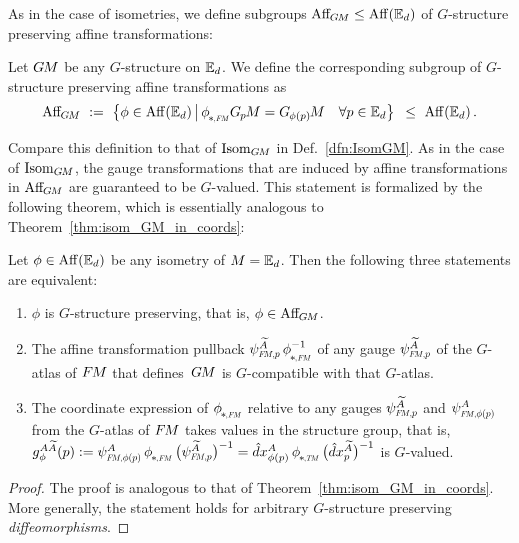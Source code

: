 As in the case of isometries, we define subgroups $\operatorname{Aff}_{\mkern-2muG\mkern-1.4muM} \leq \operatorname{Aff}(\mathbb{E}_d)$ of $G$-structure preserving affine transformations:
\begin{dfn}
\label{dfn:AffGM}
    Let $G\mkern-1.4muM$ be any $G$-structure on $\mathbb{E}_d$.
    We define the corresponding subgroup of $G$-structure preserving affine transformations as
    \begin{align}
        \AffGM\ :=\ \big\{ \phi \in \AffE 
        \,\big|\, \dphiFM \GpM = \GphipM\ \ \ \forall p \in \Euc_d \big\} 
        \,\ \leq\ \AffE \,.
    \end{align}
\end{dfn}
Compare this definition to that of $\operatorname{Isom}_{G\mkern-1.4muM}$ in Def.~\ref{dfn:IsomGM}.
As in the case of $\operatorname{Isom}_{G\mkern-1.4muM}$, the gauge transformations that are induced by affine transformations in $\operatorname{Aff}_{\mkern-2muG\mkern-1.4muM}$ are guaranteed to be $G$-valued.
This statement is formalized by the following theorem, which is essentially analogous to Theorem~\ref{thm:isom_GM_in_coords}:
\begin{thm}
\label{thm:Aff_GM_in_gauges}
    Let $\phi \in \operatorname{Aff}(\mathbb{E}_d)$ be any isometry of $M=\mathbb{E}_d$.
    Then the following three statements are equivalent:
    \begin{enumerate}
        \item $\phi$ is $G$-structure preserving, that is, $\phi \in \operatorname{Aff}_{\mkern-2muG\mkern-1.4muM}$.
        \item The affine transformation pullback $\psiFMp^{\widetilde{A}}\, \dphiFM^{-1}$ of any gauge $\psiFMp^{\widetilde{A}}$ of the $G$-atlas of $F\mkern-1.5muM$ that defines~$G\mkern-1.4muM$ is $G$-compatible with that $G$-atlas.
        \item
        The coordinate expression of $\dphiFM$ relative to any gauges $\psiFMp^{\widetilde{A}}$ and $\psiFMphip^A$ from the $G$-atlas of $F\mkern-1.5muM$ takes values in the structure group, that is,
        ${g_\phi^{A\widetilde{A}}(p)
           := \psiFMphip^A \,\dphiFM\, \big(\psiFMp^{\widetilde{A}} \big)^{-1}}
           = \hat{d}x^A_{\phi(p)} \,\dphiTM\, \big(\hat{d}x^{\widetilde{A}}_p \big)^{-1}$
        is $G$-valued.
    \end{enumerate}
\end{thm}
\begin{proof}
    The proof is analogous to that of Theorem~\ref{thm:isom_GM_in_coords}.
    More generally, the statement holds for arbitrary $G$-structure preserving \emph{diffeomorphisms}.
\end{proof}


